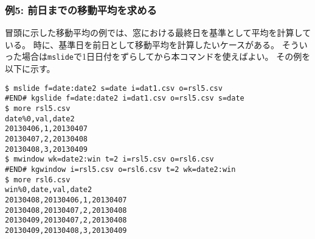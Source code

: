 \subsubsection*{例5: 前日までの移動平均を求める}

冒頭に示した移動平均の例では、窓における最終日を基準として平均を計算している。
時に、基準日を前日として移動平均を計算したいケースがある。
そういった場合は\verb|mslide|で1日日付をずらしてから本コマンドを使えばよい。
その例を以下に示す。


\begin{Verbatim}[baselinestretch=0.7,frame=single]
$ mslide f=date:date2 s=date i=dat1.csv o=rsl5.csv
#END# kgslide f=date:date2 i=dat1.csv o=rsl5.csv s=date
$ more rsl5.csv
date%0,val,date2
20130406,1,20130407
20130407,2,20130408
20130408,3,20130409
$ mwindow wk=date2:win t=2 i=rsl5.csv o=rsl6.csv
#END# kgwindow i=rsl5.csv o=rsl6.csv t=2 wk=date2:win
$ more rsl6.csv
win%0,date,val,date2
20130408,20130406,1,20130407
20130408,20130407,2,20130408
20130409,20130407,2,20130408
20130409,20130408,3,20130409
\end{Verbatim}
